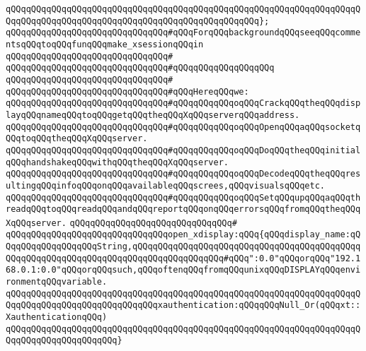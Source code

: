 \verb|qQQqqQQqqQQqqQQqqQQqqQQqqQQqqQQqqQQqqQQqqQQqqQQqqQQqqQQqqQQqqQQqqQQqqQQqqQQqqQQqqQQqqQQqqQQqqQQqqQQqqQQqqQQqqQQqqQQqqQQq};|\newline
\newline
\newline
\verb|qQQqqQQqqQQqqQQqqQQqqQQqqQQqqQQq#qQQqForqQQqbackgroundqQQqseeqQQqcommentsqQQqtoqQQqfunqQQqmake_xsessionqQQqin|\newline
\verb|qQQqqQQqqQQqqQQqqQQqqQQqqQQqqQQq#|\newline
\verb|qQQqqQQqqQQqqQQqqQQqqQQqqQQqqQQq#qQQqqQQqqQQqqQQqqQQq|\newline
\verb|qQQqqQQqqQQqqQQqqQQqqQQqqQQqqQQq#|\newline
\verb|qQQqqQQqqQQqqQQqqQQqqQQqqQQqqQQq#qQQqHereqQQqwe:|\newline
\verb|qQQqqQQqqQQqqQQqqQQqqQQqqQQqqQQq#qQQqqQQqqQQqoqQQqCrackqQQqtheqQQqdisplayqQQqnameqQQqtoqQQqgetqQQqtheqQQqXqQQqserverqQQqaddress.|\newline
\verb|qQQqqQQqqQQqqQQqqQQqqQQqqQQqqQQq#qQQqqQQqqQQqoqQQqOpenqQQqaqQQqsocketqQQqtoqQQqtheqQQqXqQQqserver.|\newline
\verb|qQQqqQQqqQQqqQQqqQQqqQQqqQQqqQQq#qQQqqQQqqQQqoqQQqDoqQQqtheqQQqinitialqQQqhandshakeqQQqwithqQQqtheqQQqXqQQqserver.|\newline
\verb|qQQqqQQqqQQqqQQqqQQqqQQqqQQqqQQq#qQQqqQQqqQQqoqQQqDecodeqQQqtheqQQqresultingqQQqinfoqQQqonqQQqavailableqQQqscrees,qQQqvisualsqQQqetc.|\newline
\verb|qQQqqQQqqQQqqQQqqQQqqQQqqQQqqQQq#qQQqqQQqqQQqoqQQqSetqQQqupqQQqaqQQqthreadqQQqtoqQQqreadqQQqandqQQqreportqQQqonqQQqerrorsqQQqfromqQQqtheqQQqXqQQqserver.|\newline
\verb|qQQqqQQqqQQqqQQqqQQqqQQqqQQqqQQq#|\newline
\verb|qQQqqQQqqQQqqQQqqQQqqQQqqQQqqQQqopen_xdisplay:qQQq{qQQqdisplay_name:qQQqqQQqqQQqqQQqqQQqString,qQQqqQQqqQQqqQQqqQQqqQQqqQQqqQQqqQQqqQQqqQQqqQQqqQQqqQQqqQQqqQQqqQQqqQQqqQQqqQQqqQQqqQQq#qQQq":0.0"qQQqorqQQq"192.168.0.1:0.0"qQQqorqQQqsuch,qQQqoftenqQQqfromqQQqunixqQQqDISPLAYqQQqenvironmentqQQqvariable.|\newline
\verb|qQQqqQQqqQQqqQQqqQQqqQQqqQQqqQQqqQQqqQQqqQQqqQQqqQQqqQQqqQQqqQQqqQQqqQQqqQQqqQQqqQQqqQQqqQQqqQQqqQQqxauthentication:qQQqqQQqNull_Or(qQQqxt::XauthenticationqQQq)|\newline
\verb|qQQqqQQqqQQqqQQqqQQqqQQqqQQqqQQqqQQqqQQqqQQqqQQqqQQqqQQqqQQqqQQqqQQqqQQqqQQqqQQqqQQqqQQqqQQq}|\newline
